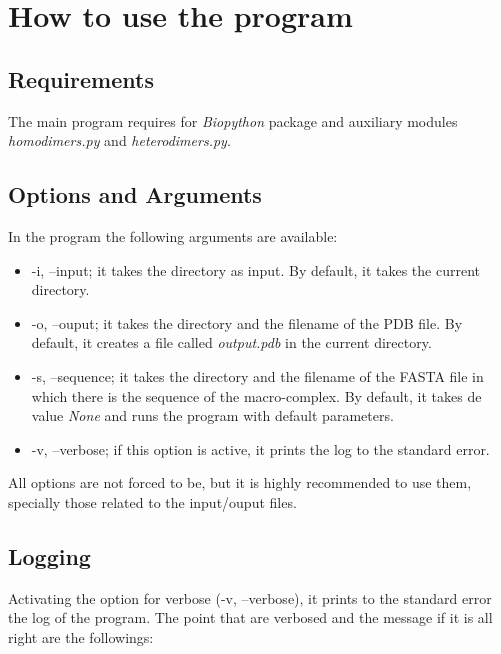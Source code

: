 \documentclass[a4paper,12pt]{report}
\begin{document}
\chapter{How to use the program}

\section{Requirements}

The main program requires for \textit{Biopython} package and auxiliary modules \textit{homodimers.py} and \textit{heterodimers.py}.

\section{Options and Arguments}

In the program the following arguments are available:

\begin{itemize}
 \item -i, --input; it takes the directory as input. By default, it takes the current directory.
 \item -o, --ouput; it takes the directory and the filename of the PDB file. By default, it creates a file called \textit{output.pdb} in the current directory.
 \item -s, --sequence; it takes the directory and the filename of the FASTA file in which there is the sequence of the macro-complex. By default, it takes de value \textit{None} and runs the program with default parameters.
 \item -v, --verbose; if this option is active, it prints the log to the standard error. 
\end{itemize}

All options are not forced to be, but it is highly recommended to use them, specially those related to the input/ouput files.

\section{Logging}

Activating the option for verbose (-v, --verbose), it prints to the standard error the log of the program. The point that are verbosed and the message if it is all right are the followings:
\end{document}
